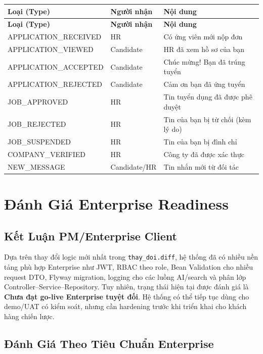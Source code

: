 \documentclass[12pt, a4paper]{report}
\begin{document}
\begin{longtable}{|p{5cm}|p{4cm}|p{5cm}|}
\hline
\textbf{Loại (Type)} & \textbf{Người nhận} & \textbf{Nội dung} \\
\hline
\endfirsthead
\hline
\textbf{Loại (Type)} & \textbf{Người nhận} & \textbf{Nội dung} \\
\hline
\endhead
APPLICATION\_RECEIVED & HR & Có ứng viên mới nộp đơn \\
\hline
APPLICATION\_VIEWED & Candidate & HR đã xem hồ sơ của bạn \\
\hline
APPLICATION\_ACCEPTED & Candidate & Chúc mừng! Bạn đã trúng tuyển \\
\hline
APPLICATION\_REJECTED & Candidate & Cảm ơn bạn đã ứng tuyển \\
\hline
JOB\_APPROVED & HR & Tin tuyển dụng đã được phê duyệt \\
\hline
JOB\_REJECTED & HR & Tin của bạn bị từ chối (kèm lý do) \\
\hline
JOB\_SUSPENDED & HR & Tin của bạn bị đình chỉ \\
\hline
COMPANY\_VERIFIED & HR & Công ty đã được xác thực \\
\hline
NEW\_MESSAGE & Candidate/HR & Tin nhắn mới từ đối tác \\
\hline
\end{longtable}

\chapter{Đánh Giá Enterprise Readiness}

\section{Kết Luận PM/Enterprise Client}

Dựa trên thay đổi logic mới nhất trong \texttt{thay\_doi.diff}, hệ thống đã có nhiều nền tảng phù hợp Enterprise như JWT, RBAC theo role, Bean Validation cho nhiều request DTO, Flyway migration, logging cho các luồng AI/search và phân lớp Controller--Service--Repository. Tuy nhiên, trạng thái hiện tại được đánh giá là \textbf{Chưa đạt go-live Enterprise tuyệt đối}. Hệ thống có thể tiếp tục dùng cho demo/UAT có kiểm soát, nhưng cần hardening trước khi triển khai cho khách hàng chiến lược.

\section{Đánh Giá Theo Tiêu Chuẩn Enterprise}
\end{document}
